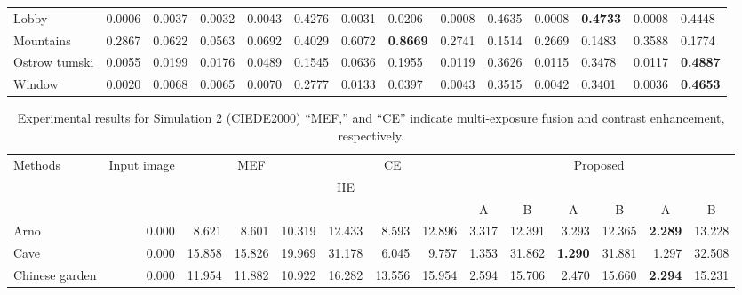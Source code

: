 \documentclass[paper]{ieice}
\begin{document}
\begin{table*}[!t]
{\begin{tabular}{l|l|lll|lll|ll|ll|ll}
Lobby & 0.0006 & 0.0037 & 0.0032 & 0.0043 & 0.4276 & 0.0031 & 0.0206 & 0.0008 & 0.4635 & 0.0008 & \textbf{0.4733} & 0.0008 & 0.4448 \\
Mountains & 0.2867 & 0.0622 & 0.0563 & 0.0692 & 0.4029 & 0.6072 & \textbf{0.8669} & 0.2741 & 0.1514 & 0.2669 & 0.1483 & 0.3588 & 0.1774 \\
Ostrow tumski & 0.0055 & 0.0199 & 0.0176 & 0.0489 & 0.1545 & 0.0636 & 0.1955 & 0.0119 & 0.3626 & 0.0115 & 0.3478 & 0.0117 & \textbf{0.4887} \\
Window & 0.0020 & 0.0068 & 0.0065 & 0.0070 & 0.2777 & 0.0133 & 0.0397 & 0.0043 & 0.3515 & 0.0042 & 0.3401 & 0.0036 & \textbf{0.4653}\\\hline
  \end{tabular}
  }
  \label{tab:CameraNaturalness}
\end{table*}
%
\begin{table*}[!t]
  \centering
  \caption{Experimental results for Simulation 2 (CIEDE2000)
  ``MEF,'' and ``CE'' indicate
  multi-exposure fusion and contrast enhancement, respectively.}
  {\small
  \begin{tabular}{l|r|rrr|rrr|rr|rr|rr} \hline \hline
    \multirow{3}{*}{Methods} & \multirow{3}{10mm}{Input image} & \multicolumn{3}{c|}{MEF} &
    \multicolumn{3}{c|}{CE} & \multicolumn{6}{c}{Proposed}\\\cline{3-14}
    & & \multicolumn{1}{c}{\cite{mertens2009exposure}} &
    \multicolumn{1}{c}{\cite{sakai2015hybrid}} & \multicolumn{1}{c|}{\cite{nejati2017fast}} &
    \multicolumn{1}{c}{HE} & \multicolumn{1}{c}{\cite{zuiderveld1994contrast}} &
    \multicolumn{1}{c|}{\cite{wu2017contrast}} &
    \multicolumn{2}{c|}{\cite{mertens2009exposure}} &
    \multicolumn{2}{c|}{\cite{sakai2015hybrid}} &
    \multicolumn{2}{c}{\cite{nejati2017fast}}\\
    &&&&&&&& \multicolumn{1}{c}{A} & \multicolumn{1}{c|}{B} &
    \multicolumn{1}{c}{A} & \multicolumn{1}{c|}{B} & \multicolumn{1}{c}{A} &
    \multicolumn{1}{c}{B}\\
    \hdashline
Arno & 0.000 & 8.621 & 8.601 & 10.319 & 12.433 & 8.593 & 12.896 & 3.317 & 12.391 & 3.293 & 12.365 & \textbf{2.289} & 13.228 \\
Cave & 0.000 & 15.858 & 15.826 & 19.969 & 31.178 & 6.045 & 9.757 & 1.353 & 31.862 & \textbf{1.290} & 31.881 & 1.297 & 32.508 \\
Chinese garden & 0.000 & 11.954 & 11.882 & 10.922 & 16.282 & 13.556 & 15.954 & 2.594 & 15.706 & 2.470 & 15.660 & \textbf{2.294} & 15.231 \\

\end{tabular}}
\end{table*}
\end{document}
